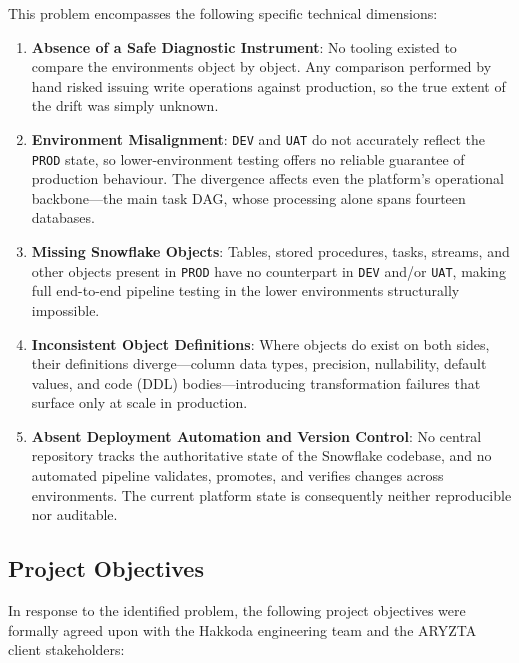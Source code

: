 This problem encompasses the following specific technical dimensions:

\begin{enumerate}
  \item \textbf{Absence of a Safe Diagnostic Instrument}: No tooling existed to compare the environments object by object. Any comparison performed by hand risked issuing write operations against production, so the true extent of the drift was simply unknown.
  \item \textbf{Environment Misalignment}: \texttt{DEV} and \texttt{UAT} do not accurately reflect the \texttt{PROD} state, so lower-environment testing offers no reliable guarantee of production behaviour. The divergence affects even the platform's operational backbone---the main task DAG, whose processing alone spans fourteen databases.
  \item \textbf{Missing Snowflake Objects}: Tables, stored procedures, tasks, streams, and other objects present in \texttt{PROD} have no counterpart in \texttt{DEV} and/or \texttt{UAT}, making full end-to-end pipeline testing in the lower environments structurally impossible.
  \item \textbf{Inconsistent Object Definitions}: Where objects do exist on both sides, their definitions diverge---column data types, precision, nullability, default values, and code (DDL) bodies---introducing transformation failures that surface only at scale in production.
  \item \textbf{Absent Deployment Automation and Version Control}: No central repository tracks the authoritative state of the Snowflake codebase, and no automated pipeline validates, promotes, and verifies changes across environments. The current platform state is consequently neither reproducible nor auditable.
\end{enumerate}

\subsection{Project Objectives}
\label{subsec:objectives}

In response to the identified problem, the following project objectives were formally agreed upon with the Hakkoda engineering team and the ARYZTA client stakeholders:


